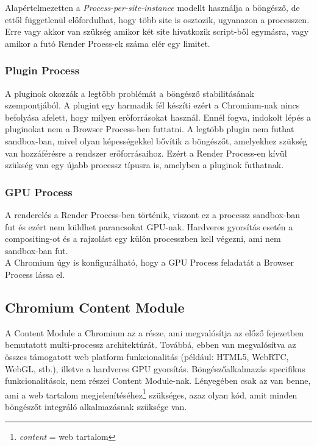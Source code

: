 \documentclass[12pt]{report}
\begin{document}
\noindent
Alapértelmezetten a \textit{Process-per-site-instance} modellt használja a böngésző, de
ettől függetlenül előfordulhat, hogy több site is osztozik, ugyanazon a processzen.
Erre vagy akkor van szükség amikor két site hivatkozik script-ből egymásra,
vagy amikor a futó Render Proess-ek száma elér egy limitet.
\cite{bib:chromium-process-models}

\subsubsection{Plugin Process}
A pluginok okozzák a legtöbb problémát a böngésző stabilitásának szempontjából. A plugint
egy harmadik fél készíti ezért a Chromium-nak nincs befolyása afelett, hogy milyen
erőforrásokat használ. Ennél fogva, indokolt lépés a pluginokat nem a Browser Process-ben
futtatni. A legtöbb plugin nem futhat sandbox-ban, mivel olyan
képességekkel bővítik a böngészőt, amelyekhez szükség van hozzáférésre a rendszer
erőforrásaihoz. Ezért a Render Process-en kívül szükség van egy újabb processz típusra is,
amelyben a pluginok futhatnak.
\cite{bib:chromium-plugins}

\subsubsection{GPU Process}
A renderelés a Render Process-ben történik, viszont ez a processz sandbox-ban fut és ezért
nem küldhet parancsokat GPU-nak. Hardveres gyorsítás esetén a compositing-ot és a rajzolást
egy külön processzben kell végezni, ami nem sandbox-ban fut.
\cite{bib:chromium-gpu} \\
A Chromium úgy is konfigurálható, hogy a GPU Process feladatát a Browser Process lássa el.

\subsection{Chromium Content Module}
A Content Module a Chromium az a része, ami megvalósítja az előző fejezetben bemutatott
multi-processz architektúrát. Továbbá, ebben van megvalósítva az összes támogatott
web platform funkcionalitás (például: HTML5, WebRTC, WebGL, stb.), illetve
a hardveres GPU gyorsítás. Böngészőalkalmazás specifikus funkcionalitások, nem részei
Content Module-nak. Lényegében csak az van benne, ami a web tartalom
megjelenítéséhez\footnote{\textit{content} = web tartalom} szükséges, azaz olyan kód,
amit minden böngészőt integráló alkalmazásnak szüksége van.
\cite{bib:chromium-content-module}
\end{document}
